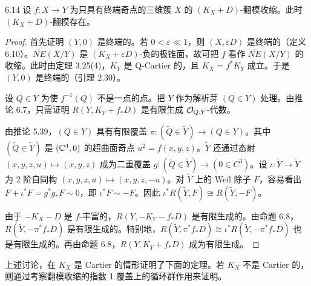 
\begin{theoremp}[三维终端翻模的存在性]{6.14}
设 $f:X\to Y$ 为只具有终端奇点的三维簇 $X$ 的 $(K_X+D)$-翻模收缩。此时 $(K_X+D)$-翻模存在。
\end{theoremp}

\begin{proof}
首先证明 $(Y,0)$ 是终端的。若 $0<\varepsilon\ll1$，则 $(X,\varepsilon D)$ 是终端的（定义 6.10）。$\overline{NE}(X/Y)$ 是 $(K_X+\varepsilon D)$-负的极锥面，故可把 $f$ 看作 $\overline{NE}(X/Y)$ 的收缩。此时由定理 3.25(4)，$K_Y$ 是 Q-Cartier 的，且 $K_X=f^*K_Y$ 成立。于是 $(Y,0)$ 是终端的（引理 2.30）。

设 $Q\in Y$ 为使 $f^{-1}(Q)$ 不是一点的点。把 $Y$ 作为解析芽 $(Q\in Y)$ 处理。由推论 6.7，只需证明 $R(Y,K_Y+f_*D)$ 是有限生成 $\mathcal{O}_{Q,Y}$-代数。

由推论 5.39，$(Q\in Y)$ 具有有限覆盖 $\pi:(\tilde Q\in\tilde Y)\to(Q\in Y)$。其中 $(\tilde Q\in\tilde Y)$ 是 $(\mathbb{C}^4,0)$ 的超曲面奇点 $u^2=f(x,y,z)$。$\tilde Y$ 还通过态射 $(x,y,z,u)\mapsto(x,y,z)$ 成为二重覆盖 $g:(\tilde Q\in\tilde Y)\to(0\in C^3)$。设 $\iota:\tilde Y\to\tilde Y$ 为 2 阶自同构 $(x,y,z,u)\mapsto(x,y,z,-u)$。对 $\tilde Y$ 上的 Weil 除子 $F$，容易看出 $F+\iota^*F=g^*g_*F\sim0$，即 $\iota^*F\sim-F$。因此 $\iota^*R(\tilde Y,F)\cong R(\tilde Y,-F)$。

由于 $-K_X-D$ 是 $f$-丰富的，$R(Y,-K_Y-f_*D)$ 是有限生成的。由命题 6.8，$R(\tilde Y,-\pi^*f_*D)$ 是有限生成的。特别地，$R(\tilde Y,\pi^*f_*D)\cong\iota^*R(\tilde Y,-\pi^*f_*D)$ 也是有限生成的。再由命题 6.8，$R(Y,K_Y+f_*D)$ 成为有限生成。
\end{proof}


上述讨论，在 $K_X$ 是 Cartier 的情形证明了下面的定理。若 $K_X$ 不是 Cartier 的，则通过考察翻模收缩的指数 1 覆盖上的循环群作用来证明。
